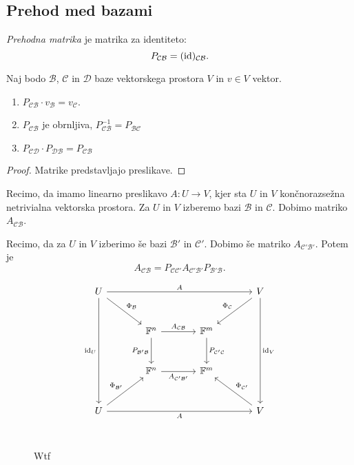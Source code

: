 \documentclass[12pt, a4paper]{article}
\begin{document}
\newpage

\subsection{Prehod med bazami}

\begin{definicija}
\emph{Prehodna matrika} je matrika za identiteto:
\[
P_{\mathcal{CB}}=(\operatorname{id})_{\mathcal{CB}}.
\]
\end{definicija}

\begin{trditev}
Naj bodo $\mathcal{B}$, $\mathcal{C}$ in $\mathcal{D}$ baze vektorskega prostora $V$ in $v\in V$ vektor.

\begin{enumerate}[label=\alph*)]
\item $P_{\mathcal{CB}}\cdot v_{\mathcal{B}}=v_{\mathcal{C}}$.
\item $P_{\mathcal{CB}}$ je obrnljiva, $P_{\mathcal{CB}}^{-1}=P_{\mathcal{BC}}$
\item $P_{\mathcal{CD}}\cdot P_{\mathcal{DB}}=P_{\mathcal{CB}}$
\end{enumerate}
\end{trditev}

\begin{proof}
Matrike predstavljajo preslikave.
\end{proof}

Recimo, da imamo linearno preslikavo $A\colon U\to V$, kjer sta $U$ in $V$ končnorazsežna netrivialna vektorska prostora. Za $U$ in $V$ izberemo bazi $\mathcal{B}$ in $\mathcal{C}$. Dobimo matriko $A_{\mathcal{CB}}$.

Recimo, da za $U$ in $V$ izberimo še bazi $\mathcal{B'}$ in $\mathcal{C'}$. Dobimo še matriko $A_{\mathcal{C'B'}}$. Potem je
\[
A_{\mathcal{CB}}=P_{\mathcal{CC'}}A_{\mathcal{C'B'}}P_{\mathcal{B'B}}.
\]

\begin{figure}[H]
\[
\begin{tikzcd}[column sep=large, row sep=large]
U \arrow[rrr, "A"] \arrow[ddd, "\id_U"'] \arrow[dr, "\Phi_{\mathcal{B}}"] &
&
&
V \arrow[ddd, "\id_V"] \arrow[dl, "\Phi_{\mathcal{C}}"']
\\
&
\F^n \arrow[r, "A_{\mathcal{CB}}"] \arrow[d, "P_\mathcal{B'B}"']
&
\F^m \arrow[d, "P_\mathcal{C'C}"]
\\
&
\F^n \arrow[r, "A_{\mathcal{C'B'}}"']
&
\F^m
\\
U \arrow[rrr, "A"'] \arrow[ur, "\Phi_{\mathcal{B'}}"]
&
&
&
V \arrow[ul, "\Phi_{\mathcal{C'}}"']
\end{tikzcd}
\]
\vspace{-30pt}\\
\caption{Wtf}
\end{figure}
\end{document}
